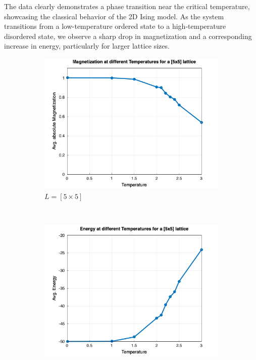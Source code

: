 The data clearly demonstrates a phase transition near the critical temperature, showcasing the classical behavior of the 2D Ising model. As the system transitions from a low-temperature ordered state to a high-temperature disordered state, we observe a sharp drop in magnetization and a corresponding increase in energy, particularly for larger lattice sizes.
\begin{figure}[t]
	\centering
	\begin{subfigure}{0.5\textwidth}
		\includegraphics[width=\textwidth]{./img/avg_mag_5.png}
		\caption{$L=[5\times5]$}
		\label{sfig:sublabel1}
	\end{subfigure}%
	~
	\begin{subfigure}{0.5\textwidth}
		\includegraphics[width=\textwidth]{./img/avg_en_5.png}

\end{subfigure}
\end{figure}
